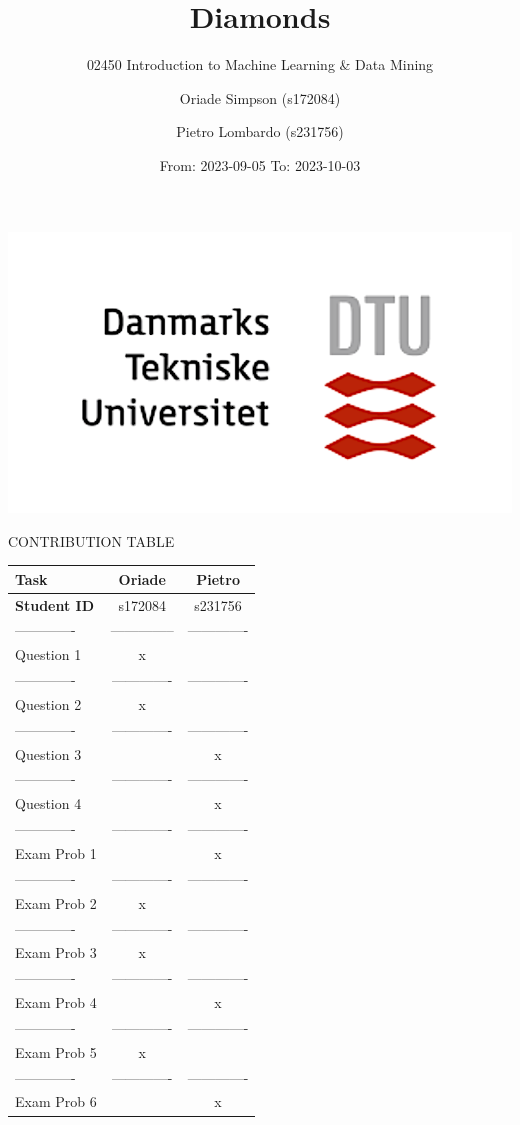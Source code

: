 \documentclass[
]{article}
\title{Diamonds}
\subtitle{02450 Introduction to Machine Learning \& Data Mining}
\author{Oriade Simpson (s172084) \and Pietro Lombardo (s231756)}
\date{From: 2023-09-05 To: 2023-10-03}
\begin{document}
\maketitle

\begin{center}\includegraphics[width=0.4\linewidth]{Images/Universe2} \end{center}

\begin{center}
CONTRIBUTION TABLE
\end{center}

\begin{longtable}[]{@{}lcc@{}}
\toprule\noalign{}
Task & Oriade & Pietro \\
\midrule\noalign{}
\endhead
\bottomrule\noalign{}
\endlastfoot
\textbf{Student ID} & s172084 & s231756 \\
------------- & -------------- & ------------- \\
Question 1 & x & \\
------------- & ------------- & ------------- \\
Question 2 & x & \\
------------- & ------------- & ------------- \\
Question 3 & & x \\
------------- & ------------- & ------------- \\
Question 4 & & x \\
------------- & ------------- & ------------- \\
Exam Prob 1 & & x \\
------------- & ------------- & ------------- \\
Exam Prob 2 & x & \\
------------- & ------------- & ------------- \\
Exam Prob 3 & x & \\
------------- & ------------- & ------------- \\
Exam Prob 4 & & x \\
------------- & ------------- & ------------- \\
Exam Prob 5 & x & \\
------------- & ------------- & ------------- \\
Exam Prob 6 & & x \\
\end{longtable}
\end{document}
